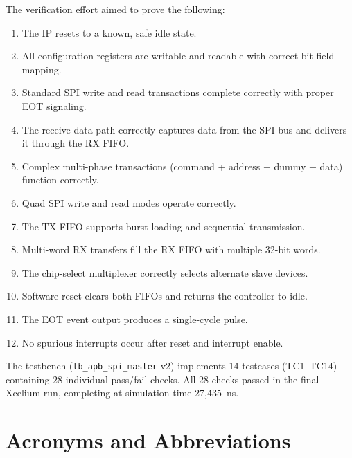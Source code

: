 The verification effort aimed to prove the following:
\begin{enumerate}[leftmargin=2em]
  \item The IP resets to a known, safe idle state.
  \item All configuration registers are writable and readable with correct bit-field mapping.
  \item Standard SPI write and read transactions complete correctly with proper EOT signaling.
  \item The receive data path correctly captures data from the SPI bus and delivers it through the
        RX FIFO.
  \item Complex multi-phase transactions (command + address + dummy + data) function correctly.
  \item Quad SPI write and read modes operate correctly.
  \item The TX FIFO supports burst loading and sequential transmission.
  \item Multi-word RX transfers fill the RX FIFO with multiple 32-bit words.
  \item The chip-select multiplexer correctly selects alternate slave devices.
  \item Software reset clears both FIFOs and returns the controller to idle.
  \item The EOT event output produces a single-cycle pulse.
  \item No spurious interrupts occur after reset and interrupt enable.
\end{enumerate}

The testbench (\texttt{tb\_apb\_spi\_master} v2) implements 14 testcases (TC1--TC14) containing
28 individual pass/fail checks. All 28 checks passed in the final Xcelium run, completing at
simulation time 27,435~ns.

\section{Acronyms and Abbreviations}

